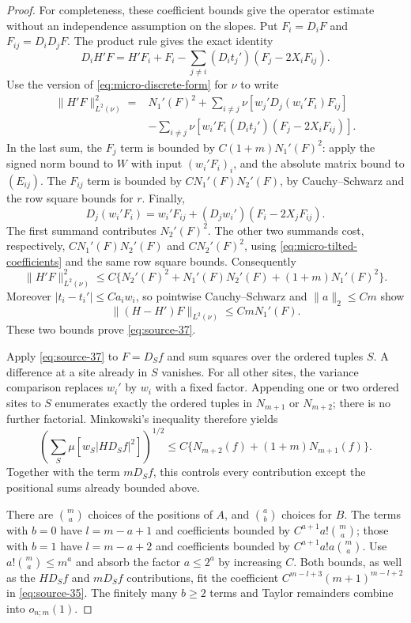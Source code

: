 \begin{proof}
For completeness, these coefficient bounds give the operator estimate
without an independence assumption on the slopes.  Put $F_i=D_iF$ and
$F_{ij}=D_iD_jF$.  The product rule gives the exact identity
\[
 D_iH'F=H'F_i+F_i
       -\sum_{j\ne i}(D_it_j')(F_j-2X_iF_{ij}).
\]
Use the version of \eqref{eq:micro-discrete-form} for $\nu$ to write
\begin{align*}
 \|H'F\|_{L^2(\nu)}^2
 ={}&N_1'(F)^2
 +\sum_{i\ne j}\nu[w_j'D_j(w_i'F_i)F_{ij}]\\
 &-\sum_{i\ne j}\nu[w_i'F_i(D_it_j')
                                      (F_j-2X_iF_{ij})].
\end{align*}
In the last sum, the $F_j$ term is bounded by
$C(1+m)N_1'(F)^2$: apply the signed norm bound to $W$ with input
$(w_i'F_i)_i$, and the absolute matrix bound to $(E_{ij})$.
The $F_{ij}$ term is bounded by $CN_1'(F)N_2'(F)$, by Cauchy--Schwarz
and the row square bounds for $r$.  Finally,
\[
 D_j(w_i'F_i)=w_i'F_{ij}+(D_jw_i')(F_i-2X_jF_{ij}).
\]
The first summand contributes $N_2'(F)^2$.  The other two summands cost,
respectively, $CN_1'(F)N_2'(F)$ and $CN_2'(F)^2$, using
\eqref{eq:micro-tilted-coefficients} and the same row square bounds.
Consequently
\[
 \|H'F\|_{L^2(\nu)}^2
 \le C\{N_2'(F)^2+N_1'(F)N_2'(F)+(1+m)N_1'(F)^2\}.
\]
Moreover $|t_i-t_i'|\le Ca_iw_i$, so pointwise Cauchy--Schwarz and
$\|a\|_2\le Cm$ show
\[
 \|(H-H')F\|_{L^2(\nu)}\le CmN_1'(F).
\]
These two bounds prove \eqref{eq:source-37}.

Apply \eqref{eq:source-37} to $F=D_Sf$ and sum squares over the ordered
tuples $S$.  A difference at a site already in $S$ vanishes.  For all
other sites, the variance comparison replaces $w_i'$ by $w_i$ with a
fixed factor.  Appending one or two ordered sites to $S$ enumerates
exactly the ordered tuples in $N_{m+1}$ or $N_{m+2}$; there is no further
factorial.  Minkowski's inequality therefore yields
\[
 \left(\sum_S\mu[w_S|HD_Sf|^2]\right)^{1/2}
       \le C\{N_{m+2}(f)+(1+m)N_{m+1}(f)\}.
\]
Together with the term $mD_Sf$, this controls every contribution except
the positional sums already bounded above.

There are $\binom ma$ choices of the positions of $A$, and
$\binom ab$ choices for $B$.  The terms with $b=0$ have
$l=m-a+1$ and coefficients bounded by $C^{a+1}a!\binom ma$;
those with $b=1$ have $l=m-a+2$ and coefficients bounded by
$C^{a+1}a!a\binom ma$.  Use $a!\binom ma\le m^a$ and absorb the
factor $a\le2^a$ by increasing $C$.  Both bounds, as well as the
$HD_Sf$ and $mD_Sf$ contributions, fit the coefficient
$C^{m-l+3}(m+1)^{m-l+2}$ in \eqref{eq:source-35}.  The finitely many
$b\ge2$ terms and Taylor remainders combine into $o_{n;m}(1)$.
\end{proof}

